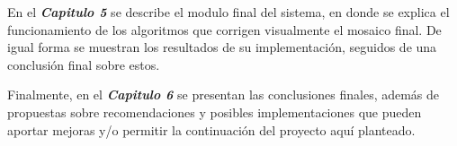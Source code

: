 En el \textit{\textbf{Capitulo 5}} se describe el modulo final del sistema, en donde se explica el funcionamiento de los algoritmos que corrigen visualmente el mosaico final. De igual forma se muestran los resultados de su implementación, seguidos de una conclusión final sobre estos.

Finalmente, en el \textit{\textbf{Capitulo 6}} se presentan las conclusiones finales, además de propuestas sobre recomendaciones y posibles implementaciones que pueden aportar mejoras y/o permitir la continuación del proyecto aquí planteado.